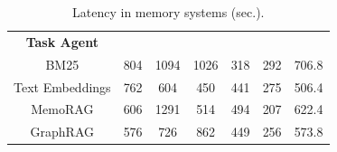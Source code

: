 \begin{table}[h]
{\begin{tabular}{@{}ccccccc@{}}
\textbf{Task Agent}     &              &              &              &               &               &              \\
BM25                    & 804          & 1094         & 1026         & 318           & 292           & 706.8        \\
Text Embeddings         & 762          & 604          & 450          & 441           & 275           & 506.4        \\
MemoRAG                 & 606          & 1291         & 514          & 494           & 207           & 622.4        \\
GraphRAG                & 576          & 726          & 862          & 449           & 256           & 573.8        \\ \bottomrule
\end{tabular}%
}
\caption{Latency in memory systems (sec.).}
\label{appendix: latency}
\end{table}
